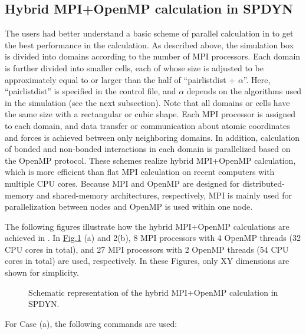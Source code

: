 \documentclass[a4paper,11pt,oneside,english]{sphinxmanual}
\begin{document}
\subsection{Hybrid MPI+OpenMP calculation in SPDYN}
\label{\detokenize{02_Available_Programs:hybrid-mpi-openmp-calculation-in-spdyn}}
The users had better understand a basic scheme of parallel calculation in 
to get the best performance in the calculation.
As described above, the simulation box is divided into domains
according to the number of MPI processors.
Each domain is further divided into smaller cells, each of whose size is adjusted to be
approximately equal to or larger than the half of “pairlistdist + \(\alpha\)”.
Here, “pairlistdist” is specified in the control file, and \(\alpha\) depends on the
algorithms used in the simulation (see the next subsection).
Note that all domains or cells have the same size with a rectangular or cubic shape.
Each MPI processor is assigned to each domain, and data transfer or communication
about atomic coordinates and forces is achieved between only neighboring domains.
In addition, calculation of bonded and non-bonded interactions in each domain is
parallelized based on the OpenMP protocol.
These schemes realize hybrid MPI+OpenMP calculation, which is more efficient than
flat MPI calculation on recent computers with multiple CPU cores.
Because MPI and OpenMP are designed for distributed-memory and shared-memory
architectures, respectively, MPI is mainly used for parallelization between
nodes and OpenMP is used within one node.

The following figures illustrate how the hybrid MPI+OpenMP calculations are achieved in .
In \hyperref[\detokenize{02_Available_Programs:domain-decomposition}]{Fig.\@ \ref{\detokenize{02_Available_Programs:domain-decomposition}}} (a) and 2(b), 8 MPI processors with 4 OpenMP threads (32 CPU cores
in total), and 27 MPI processors with 2 OpenMP threads
(54 CPU cores in total) are used, respectively.
In these Figures, only XY dimensions are shown for simplicity.

\begin{figure}[htbp]
\centering
\capstart

\noindent{}
\caption{Schematic representation of the hybrid MPI+OpenMP calculation in SPDYN.}\label{\detokenize{02_Available_Programs:domain-decomposition}}\end{figure}

For Case (a), the following commands are used:
\end{document}
